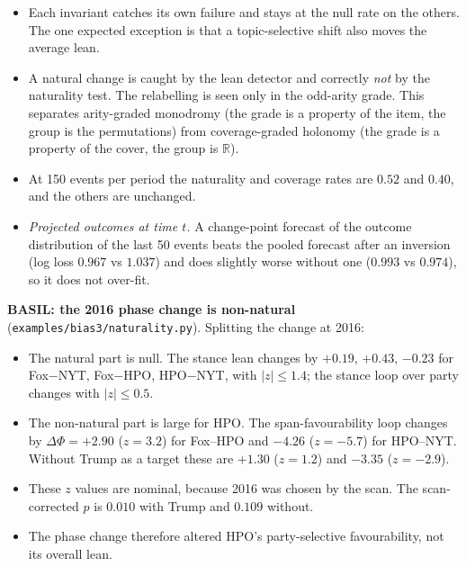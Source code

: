 \documentclass[11pt]{article}
\theoremstyle{definition}
\theoremstyle{remark}
\newcommand{\R}{\mathbb{R}}
\begin{document}
\begin{itemize}
  \item Each invariant catches its own failure and stays at the null rate on the others. The one expected exception is that a topic-selective shift also moves the average lean.
  \item A natural change is caught by the lean detector and correctly \emph{not} by the naturality test. The relabelling is seen only in the odd-arity grade. This separates arity-graded monodromy (the grade is a property of the item, the group is the permutations) from coverage-graded holonomy (the grade is a property of the cover, the group is $\R$).
  \item At 150 events per period the naturality and coverage rates are $0.52$ and $0.40$, and the others are unchanged.
  \item \emph{Projected outcomes at time $t$.} A change-point forecast of the outcome distribution of the last 50 events beats the pooled forecast after an inversion (log loss $0.967$ vs $1.037$) and does slightly worse without one ($0.993$ vs $0.974$), so it does not over-fit.
\end{itemize}

\textbf{BASIL: the 2016 phase change is non-natural} (\texttt{examples/bias3/naturality.py}). Splitting the change at 2016:
\begin{itemize}
  \item The natural part is null. The stance lean changes by $+0.19$, $+0.43$, $-0.23$ for Fox$-$NYT, Fox$-$HPO, HPO$-$NYT, with $|z|\le1.4$; the stance loop over party changes with $|z|\le0.5$.
  \item The non-natural part is large for HPO. The span-favourability loop changes by $\Delta\Phi=+2.90$ ($z=3.2$) for Fox--HPO and $-4.26$ ($z=-5.7$) for HPO--NYT. Without Trump as a target these are $+1.30$ ($z=1.2$) and $-3.35$ ($z=-2.9$).
  \item These $z$ values are nominal, because 2016 was chosen by the scan. The scan-corrected $p$ is $0.010$ with Trump and $0.109$ without.
  \item The phase change therefore altered HPO's party-selective favourability, not its overall lean.
\end{itemize}
\end{document}
